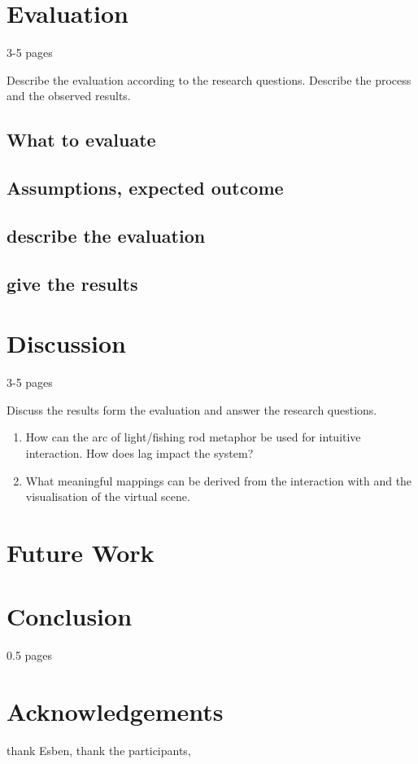 \documentclass[10pt,a4paper]{scrartcl}
\begin{document}
\section{Evaluation}
\label{sec:evaluation}
3-5 pages

Describe the evaluation according to the research questions. Describe the process and the observed results.

\subsection{What to evaluate}
\subsection{Assumptions, expected outcome}
\subsection{describe the evaluation}
\subsection{give the results}


\section{Discussion}
\label{sec:discussion}
3-5 pages

Discuss the results form the evaluation and answer the research questions. 

\begin{enumerate}
\item How can the arc of light/fishing rod metaphor be used for intuitive interaction. How does lag impact the system?
\item What meaningful mappings can be derived from the interaction with and the visualisation of the virtual scene.
\end{enumerate}

\section{Future Work}

\section{Conclusion}
0.5 pages

\section{Acknowledgements}
thank Esben, thank the participants,






\end{document}
